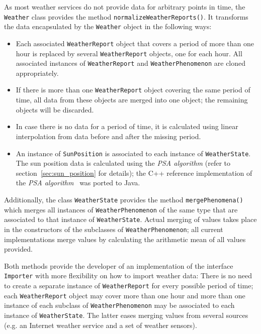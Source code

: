 As most weather services do not provide data for arbitrary points in time, the \texttt{Weather} class provides the method \texttt{normalizeWeatherReports()}. It transforms the data encapsulated by the \texttt{Weather} object in the following ways:
\begin{itemize}
  \item Each associated \texttt{WeatherReport} object that covers a period of more than one hour is replaced by several \texttt{WeatherReport} objects, one for each hour. All associated instances of \texttt{WeatherReport} and \texttt{WeatherPhenomenon} are cloned appropriately.
  
  \item If there is more than one \texttt{WeatherReport} object covering the same period of time, all data from these objects are merged into one object; the remaining objects will be discarded.
  
  \item In case there is no data for a period of time, it is calculated using linear interpolation from data before and after the missing period\cite{maths}.
  
  \item An instance of \texttt{SunPosition} is associated to each instance of \texttt{WeatherState}. The sun position data is calculated using the \emph{PSA algorithm}\cite{PSA_algorithm} (refer to section~\ref{sec:sun_position} for details); the C++ reference implementation of the \emph{PSA algorithm}~\cite{psa_online} was ported to Java.
\end{itemize}

Additionally, the class \texttt{WeatherState} provides the method \texttt{mergePhenomena()} which merges all instances of \texttt{WeatherPhenomenon} of the same type that are associated to that instance of \texttt{WeatherState}. Actual merging of values takes place in the constructors of the subclasses of \texttt{WeatherPhenomenon}; all current implementations merge values by calculating the arithmetic mean of all values provided\cite{maths}.

Both methods provide the developer of an implementation of the interface \texttt{Importer} with more flexibility on how to import weather data: There is no need to create a separate instance of \texttt{WeatherReport} for every possible period of time; each \texttt{WeatherReport} object may cover more than one hour and more than one instance of each subclass of \texttt{WeatherPhenomenon} may be associated to each instance of \texttt{WeatherState}. The latter eases merging values from several sources (e.g. an Internet weather service and a set of weather sensors).

